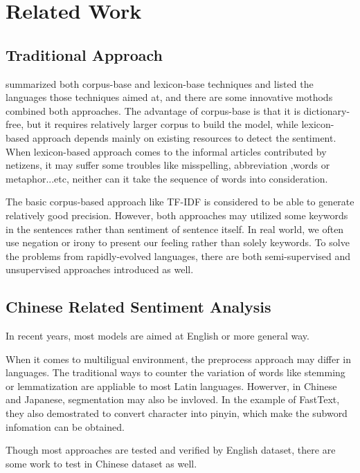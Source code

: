 \chapter{Related Work}


\section{Traditional Approach}

\cite{Dashtipour2016} summarized both corpus-base and lexicon-base techniques and listed the languages those techniques aimed at, and there are some innovative mothods combined both approaches. 
The advantage of corpus-base is that it is dictionary-free, but it requires relatively larger corpus to build the model, while lexicon-based approach depends mainly on existing resources to detect the sentiment.
When lexicon-based approach comes to the informal articles contributed by netizens, it may suffer some troubles like misspelling, abbreviation ,words or metaphor...etc, neither can it take the sequence of words into consideration.   

The basic corpus-based approach like TF-IDF is considered to be able to generate relatively good precision.
However, both approaches may utilized some keywords in the sentences rather than sentiment of sentence itself. In real world, we often use negation or irony to present our feeling rather than solely keywords. 
To solve the problems from rapidly-evolved languages, there are both semi-supervised and unsupervised approaches introduced as well. 

\section{Chinese Related Sentiment Analysis}

In recent years, most models are aimed at English or more general way. 

When it comes to multiligual environment, the preprocess approach may differ in languages. The traditional ways to counter the variation of words like stemming or lemmatization are appliable to most Latin languages.
Howerver, in Chinese and Japanese, segmentation may also be invloved. In the example of FastText\cite{joulin2016fasttext}, they also demostrated to convert character into pinyin, which make the subword infomation can be obtained. 

Though most approaches are tested and verified by English dataset, there are some work to test in Chinese dataset as well.

